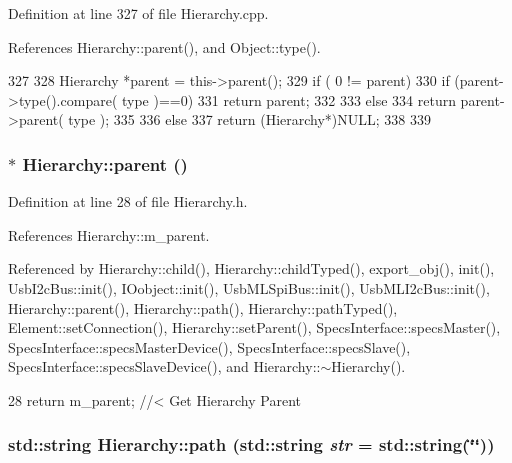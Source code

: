 Definition at line 327 of file Hierarchy.cpp.

References Hierarchy::parent(), and Object::type().


\begin{DoxyCode}
327                                             {
328   Hierarchy *parent = this->parent();
329   if ( 0 != parent){
330     if (parent->type().compare( type )==0) {
331       return parent;
332     }
333     else
334       return parent->parent( type );
335   }
336   else {
337     return (Hierarchy*)NULL;
338   }
339 }
\end{DoxyCode}
\hypertarget{classHierarchy_a1c7bec8257e717f9c1465e06ebf845fc}{
\subsubsection[{parent}]{$\ast$ Hierarchy::parent ()}}
\label{classHierarchy_a1c7bec8257e717f9c1465e06ebf845fc}


Definition at line 28 of file Hierarchy.h.

References Hierarchy::m\_\-parent.

Referenced by Hierarchy::child(), Hierarchy::childTyped(), export\_\-obj(), init(), UsbI2cBus::init(), IOobject::init(), UsbMLSpiBus::init(), UsbMLI2cBus::init(), Hierarchy::parent(), Hierarchy::path(), Hierarchy::pathTyped(), Element::setConnection(), Hierarchy::setParent(), SpecsInterface::specsMaster(), SpecsInterface::specsMasterDevice(), SpecsInterface::specsSlave(), SpecsInterface::specsSlaveDevice(), and Hierarchy::$\sim$Hierarchy().


\begin{DoxyCode}
28 { return m_parent; }  //< Get Hierarchy Parent
\end{DoxyCode}
\hypertarget{classHierarchy_aa7990fa7caf132d83e361ce033c6c65a}{
\subsubsection[{path}]{\setlength{\rightskip}{0pt plus 5cm}std::string Hierarchy::path (std::string {\em str} = {\ttfamily std::string(\char`\"{}\char`\"{})})}}
\label{classHierarchy_aa7990fa7caf132d83e361ce033c6c65a}


